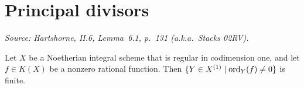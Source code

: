 \section{Principal divisors}
\begin{lemma}

  \label{lem:rationalMap_order_finite_support}
  \textit{Source: Hartshorne, II.6, Lemma~6.1, p.~131 (a.k.a.\ Stacks 02RV).}

  Let \(X\) be a Noetherian integral scheme that is regular in
  codimension one, and let \(f \in K(X)\) be a nonzero rational function.
  Then \(\{Y \in X^{(1)} \mid \operatorname{ord}_Y(f) \ne 0\}\) is finite.
\end{lemma}

